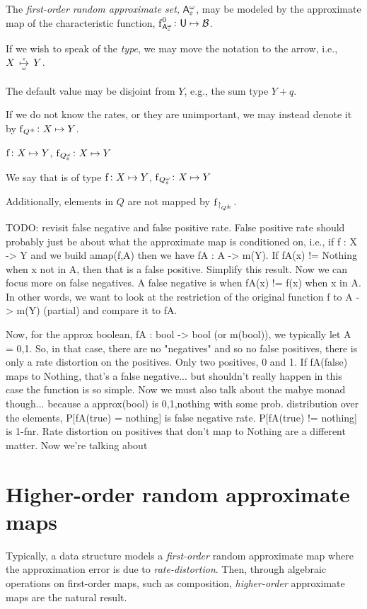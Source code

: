 \documentclass[11pt,final,hidelinks]{article}
\newcommand{\amapsto}[2]{\,\ATOverUnder{\mapsto}[#1][\text{\raisebox{3pt}{$#2$}}]\,}
\begin{document}
The \emph{first-order random approximate set}, $\ASet{A}[\fprate][\fnrate]$, may be modeled by the approximate map of the characteristic function, $\Fun{f}[\ASet{A}[\fprate][\fnrate]][0] \colon \Set{U} \mapsto \BitSet$.

If we wish to speak of the \emph{type}, we may move the notation to the arrow, i.e., $X \amapsto{\fprate}{\fnrate} Y$.

The default value may be disjoint from $Y$, e.g., the sum type $Y + q$.

If we do not know the rates, or they are unimportant, we may instead denote it by $\Fun{f}[\AT{Q}] \colon X \mapsto Y$.


$\Fun{f} \colon X \mapsto Y$, $\Fun{f}[\AT{Q}[\fprate][\fnrate]] \colon X \mapsto Y$

We say that is of type 
$\Fun{f} \colon X \mapsto Y$, $\Fun{f}[\AT{Q}[\fprate][\fnrate]] \colon X \mapsto Y$


Additionally, elements in $Q$ are not mapped by $\Fun{f}_{\restriction_{\AT{Q}}}$.



TODO: revisit false negative and false positive rate. False positive rate should probably just be about what the approximate map is conditioned on, i.e., if f : X -> Y and we build amap(f,A) then we have fA : A -> m(Y). If fA(x) != Nothing when x not in A, then that is a false positive. Simplify this result. Now we can focus more on false negatives. A false negative is when fA(x) != f(x) when x in A. In other words, we want to look at the restriction of the original function f to A -> m(Y) (partial) and compare it to fA.

Now, for the approx boolean, fA : bool -> bool (or m(bool)), we typically let A = {0,1}. So, in that case, there are no "negatives" and so no false positives, there is only a rate distortion on the positives. Only two positives, 0 and 1. If fA(false) maps to Nothing, that's a false negative... but shouldn't really happen in this case the function is so simple. Now we must also talk about the mabye monad though... because a approx(bool) is {0,1,nothing} with some prob. distribution over the elements, P[fA(true) = nothing] is false negative rate. P[fA(true) != nothing] is 1-fnr. Rate distortion on positives that don't map to Nothing are a different matter. Now we're talking about

\providecommand{\mainx}{..}
\section{Higher-order random approximate maps}
Typically, a data structure models a \emph{first-order} random approximate map where the approximation error is due to \emph{rate-distortion}.
Then, through algebraic operations on first-order maps, such as composition, \emph{higher-order} approximate maps are the natural result.
\end{document}
